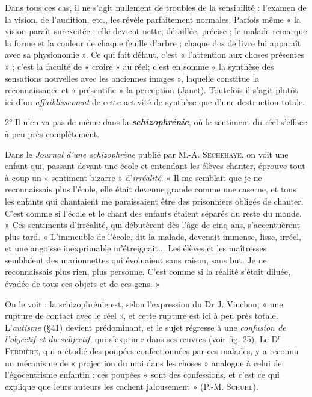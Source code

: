 Dans tous ces cas, il ne s’agit nullement de troubles de la sensibilité :
l'examen de la vision, de l’audition, etc., les révèle parfaitement
normales. Parfois même « la vision paraît surexcitée ; elle
devient nette, détaillée, précise ; le malade remarque la forme et la
couleur de chaque feuille d’arbre ; chaque dos de livre lui apparaît
avec sa physionomie ». Ce qui fait défaut, c’est « l’attention aux choses
présentes » ; c’est la faculté de « croire » au réel; c’est en somme « la
synthèse des sensations nouvelles avec les anciennes images », laquelle
constitue la reconnaissance et « présentifie » la perception (Janet).
Toutefois il s’agit plutôt ici d’un {\it affaiblissement} de cette activité
de synthèse que d’une destruction totale.

2° Il n’en va pas de même dans la \textbf{\textit {schizophrénie}}, où le sentiment
du réel s’efface à peu près complètement.

Dans le {\it Journal d'une schizophrène} publié par M.-A. \textsc{Sechehaye}, on voit
une enfant qui, passant devant une école et entendant les élèves chanter,
éprouve tout à coup un « sentiment bizarre » d’{\it irréalité}. « Il me semblait
que je ne reconnaissais plus l’école, elle était devenue grande comme une
caserne, et tous les enfants qui chantaient me paraissaient être des prisonniers
obligés de chanter. C'est comme si l’école et le chant des enfants
étaient séparés du reste du monde. » Ces sentiments d’irréalité, qui débutèrent
dès l’âge de cinq ans, s’accentuèrent plus tard. « L'immeuble de
l'école, dit la malade, devenait immense, lisse, irréel, et une angoisse inexprimable
m'étreignait... Les élèves et les maîtresses semblaient des marionnettes
qui évoluaient sans raison, sans but. Je ne reconnaissais plus rien,
plus personne. C’est comme si la réalité s'était diluée, évadée de tous ces
objets et de ces gens. »

On le voit : la schizophrénie est, selon l’expression du Dr J. Vinchon,
« une rupture de contact avec le réel », et cette rupture est ici
à peu près totale. L’{\it autisme} (\S 41) devient prédominant, et le sujet
régresse à une {\it confusion de l'objectif et du subjectif}, qui s'exprime dans
ses œuvres (voir fig. 25). Le D$^\text{r}$ \textsc{Ferdière}, qui a étudié des poupées
confectionnées par ces malades, y a reconnu un mécanisme de « projection
du moi dans les choses » analogue à celui de l’égocentrisme
enfantin : ces poupées « sont des confessions, et c’est ce qui explique que
leurs auteurs les cachent jalousement » (P.-M. \textsc{Schuhl}).


